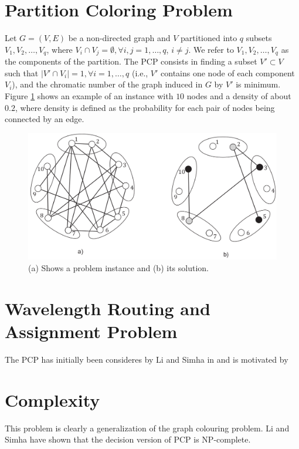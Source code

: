 \section{Partition Coloring Problem}

Let $G = (V, E)$ be a non-directed graph and $V$ partitioned into $q$ subsets $V_1, V_2,\ldots, V_q$, where $V_i \cap V_j = \emptyset, \forall i, j = 1, \ldots , q$, $i \neq j$. We refer to $V_1, V_2, \ldots , V_q$ as the components of the partition. The PCP consists in finding a subset $V' \subset V$ such that $|V' \cap V_i| = 1, \forall i = 1, \ldots , q$ (i.e., $V'$ contains one node of each component $V_i$), and the chromatic number of the graph induced in $G$ by $V'$ is minimum.\\
Figure \ref{pd:pcpExample} shows an example of an instance with $10$ nodes and a density of about $0.2$, where density is defined as the probability for each pair of nodes being connected by an edge.

\begin{figure}
\begin{center}
\includegraphics[scale=0.3]{figures/pcp.png}
\caption{(a) Shows a problem instance and (b) its solution.}
\label{pd:pcpExample}
\end{center}
\end{figure}


\section{Wavelength Routing and Assignment Problem}

The PCP has initially been consideres by Li and Simha in \cite{li-00} and is motivated by 

\section{Complexity}
This problem is clearly a generalization of the graph colouring problem. Li and Simha \cite{li-00}	
have shown that the decision version of PCP is
NP-complete.


